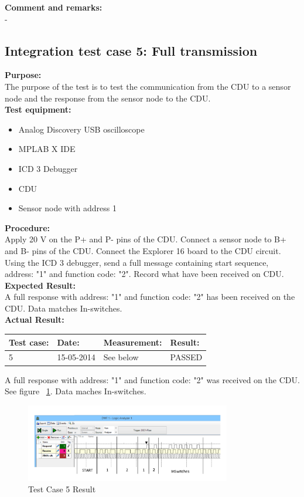 \textbf{Comment and remarks:}\\
-\\
\subsection{Integration test case 5: Full transmission}
\textbf{Purpose:}\\
The purpose of the test is to test the communication from the CDU to a sensor node and the response from the sensor node to the CDU.\\

\textbf{Test equipment:}
\begin{itemize}
\item Analog Discovery USB oscilloscope
\item MPLAB X IDE
\item ICD 3 Debugger
\item CDU
\item Sensor node with address 1
\end{itemize}

\textbf{Procedure:}\\
Apply 20 V on the P+ and P- pins of the CDU. Connect a sensor node to B+ and B- pins of the CDU. Connect the Explorer 16 board to the CDU circuit. Using the ICD 3 debugger, send a full message containing start sequence, address: "1" and function code: "2". Record what have been received on CDU.\\

\textbf{Expected Result:}\\
A full response with address: "1" and function code: "2" has been received on the CDU. Data matches In-switches.\\

\textbf{Actual Result:}\\
\begin{table}[H]
\centering
\begin{tabular}{|p{2cm}|p{2cm}|p{3cm}|p{2cm}|}\hline
\textbf{Test case:} & \textbf{Date:} & \textbf{Measurement:} & \textbf{Result:} \\ \hline
5 & 15-05-2014 & See below & PASSED \\ \hline
\end{tabular}
\end{table}
A full response with address: "1" and function code: "2" was received on the CDU. See figure ~\ref{fig:InteTestCase5}. Data maches In-switches.\\
\begin{figure}[H]
\centering
\includegraphics[width=0.8\textwidth]{billeder/intetestcase5}
\caption{Test Case 5 Result}
\label{fig:InteTestCase5}
\end{figure}


